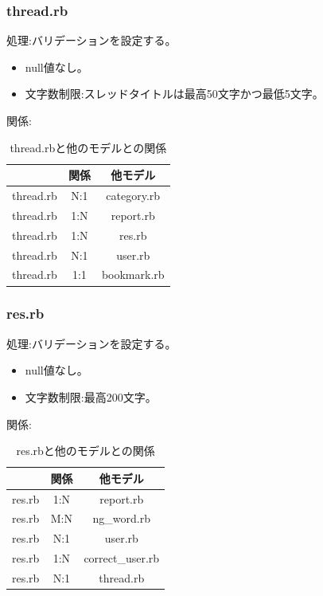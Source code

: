 \documentclass[a4j]{jarticle}
\begin{document}
\subsubsection{thread.rb}
\noindent
処理:バリデーションを設定する。
\begin{itemize}
  \item null値なし。
  \item 文字数制限:スレッドタイトルは最高50文字かつ最低5文字。
\end{itemize}
関係:
\begin{table}[H]
  \centering
  \caption{thread.rbと他のモデルとの関係}
  \begin{tabular}{|c|c|c|}\hline
    & 関係 & 他モデル\\ \hline \hline
    thread.rb & N:1 & category.rb \\ \hline
    thread.rb & 1:N & report.rb \\ \hline
    thread.rb & 1:N & res.rb \\ \hline
    thread.rb & N:1 & user.rb \\ \hline
    thread.rb & 1:1 & bookmark.rb \\ \hline
  \end{tabular}
\end{table}

\subsubsection{res.rb}
\noindent
処理:バリデーションを設定する。
\begin{itemize}
  \item null値なし。
  \item 文字数制限:最高200文字。
\end{itemize}
関係:
\begin{table}[H]
  \centering
  \caption{res.rbと他のモデルとの関係}
  \begin{tabular}{|c|c|c|}\hline
    & 関係 & 他モデル\\ \hline \hline
    res.rb & 1:N & report.rb \\ \hline
    res.rb & M:N & ng\_word.rb \\ \hline
    res.rb & N:1 & user.rb \\ \hline
    res.rb & 1:N & correct\_user.rb \\ \hline
    res.rb & N:1 & thread.rb \\ \hline
  \end{tabular}
\end{table}
\end{document}
